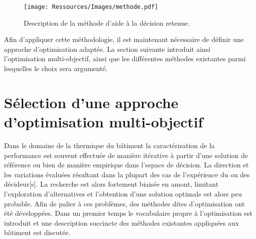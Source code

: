 \begin{figure}
    \begin{center}
        \texttt{[image: Ressources/Images/methode.pdf]}
    \end{center}
    \caption{Description de la méthode d’aide à la décision retenue.
             \label{fig:methode_aide_decision}}
\end{figure}

Afin d’appliquer cette méthodologie, il est maintenant nécessaire de définir une approche
d’optimisation adaptée. La section suivante introduit ainsi l’optimisation multi-objectif,
ainsi que les différentes méthodes existantes parmi lesquelles le choix sera argumenté.





\section{Sélection d’une approche d’optimisation multi-objectif} %
\label{sec:selection_d_une_approche_d_optimisation_multi_objectif}
Dans le domaine de la thermique du bâtiment la caractérisation de la performance est
souvent effectuée de manière itérative à partir d’une solution de référence ou bien de
manière empirique dans l’espace de décision. La direction et les variations évaluées
résultant dans la plupart des cas de l’expérience du ou des décideur[s]. La recherche est
alors fortement biaisée en amont, limitant l’exploration d’alternatives et l’obtention
d’une solution optimale est alors peu probable. Afin de palier à ces problèmes, des
méthodes dites d’optimisation ont été développées. Dans un premier temps le vocabulaire
propre à l’optimisation est introduit et une description succincte des méthodes existantes
appliquées aux bâtiment est discutée.



